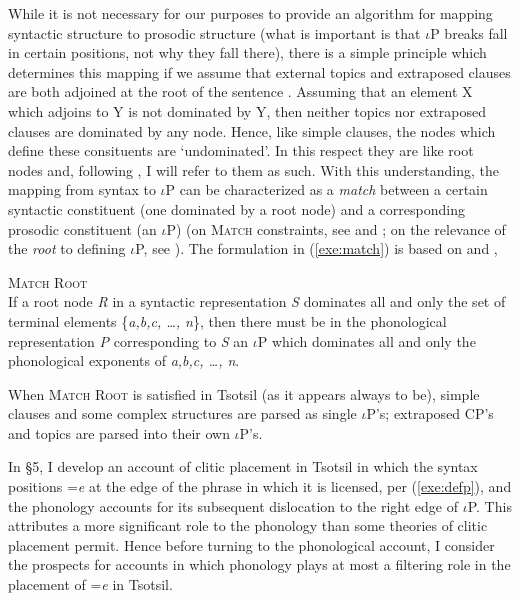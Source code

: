 \documentclass[output=paper,
modfonts
]{LSP/langsci}
\begin{document}
While it is not necessary for our purposes to provide an algorithm for mapping syntactic structure to
prosodic structure (what is important is that  $\iota$P breaks fall in certain positions, not why they fall there), there is a simple
principle which determines this mapping if we assume that external topics and extraposed clauses are both adjoined at the root
of the sentence \citep{aissen1992}.
 Assuming that an element X which adjoins to Y is not dominated by Y, then neither topics nor extraposed clauses are dominated by any node. Hence, like simple clauses, the nodes which define these consituents are `undominated'. In this respect they are like root nodes
 and, following \citet{frank2002ais}, I will refer to them as such.
With this understanding, the mapping from syntax to $\iota$P can be characterized as a \emph{match} between a certain syntactic constituent (one dominated by a root node) 
and a corresponding prosodic constituent (an $\iota$P) (on \textsc{Match} constraints, see \citealt{selkirk2009} and \citealt{elfner2012};  on the relevance of the \emph{root} to defining $\iota$P, see \citealt{downing1970, nesporvogel1986, selkirk2009}). The formulation in (\ref{exe:match}) is based on \citet{bennettetal} and \citet{elfner2012},
\begin{exe}
\ex
\textsc{Match Root} \\
If a root node \emph{R} in a syntactic representation \emph{S} dominates all and only the set of terminal elements \{\emph{a,b,c, \dots, n}\}, 
then there must be in the phonological representation \emph{P} corresponding to \emph{S} an $\iota$P which dominates all and only
 the phonological exponents of \emph{a,b,c, \dots, n}.
\label{exe:match}
\end{exe}
When \textsc{Match Root} is satisfied in Tsotsil (as it appears always to be), 
simple clauses and some complex structures are parsed as single $\iota$P's; extraposed CP's and topics are  parsed into their own $\iota$P's.  

In \S5, I develop an account of clitic placement in Tsotsil in which the syntax positions =\emph{e} at the edge of the phrase in which
it is licensed, per (\ref{exe:defp}), and the phonology accounts for its subsequent dislocation to the right edge of $\iota$P.  This attributes
a more significant role to the phonology than some theories of clitic placement permit.
Hence before turning to the phonological account,
I consider the prospects for accounts in which phonology plays at most a filtering role in the placement of =\emph{e} in Tsotsil.
\end{document}
